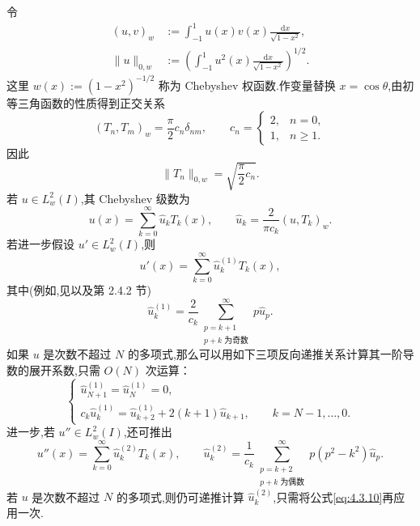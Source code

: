 令
\begin{equation}\label{eq:4.3.5}
  \begin{aligned}
    (u,v)_w&:=\int_{-1}^1u(x)v(x)\frac{\mathrm dx}{\sqrt{1-x^2}},\\
    \|u\|_{0,w}&:=\left(\int_{-1}^1u^2(x)\frac{\mathrm dx}{\sqrt{1-x^2}}\right)^{1/2}.
  \end{aligned}
\end{equation}
这里 \(w(x):=(1-x^2)^{-1/2}\) 称为 Chebyshev 权函数.作变量替换 \(x=\cos\theta\),由初等三角函数的性质得到正交关系
\begin{equation}\label{eq:4.3.6}
  (T_n,T_m)_w=\frac\pi2c_n\delta_{nm},\qquad
  c_n=\begin{cases}2,&n=0,\\1,&n\ge1.\end{cases}
\end{equation}
因此
\[
  \|T_n\|_{0,w}=\sqrt{\frac\pi2c_n}.
\]
若 \(u\in L_w^2(I)\),其 Chebyshev 级数为
\begin{equation}\label{eq:4.3.7}
  u(x)=\sum_{k=0}^\infty\widehat u_k T_k(x),\qquad
  \widehat u_k=\frac{2}{\pi c_k}(u,T_k)_w.
\end{equation}
若进一步假设 \(u'\in L_w^2(I)\),则
\begin{equation}\label{eq:4.3.8}
  u'(x)=\sum_{k=0}^\infty\widehat u_k^{(1)} T_k(x),
\end{equation}
其中(例如,见以及第 2.4.2 节)
\begin{equation}\label{eq:4.3.9}
  \widehat u_k^{(1)}=\frac2{c_k}
    \sum_{\substack{p=k+1\\p+k\text{ 为奇数}}}^{\infty}p\widehat u_p.
\end{equation}
如果 \(u\) 是次数不超过 \(N\) 的多项式,那么可以用如下三项反向递推关系计算其一阶导数的展开系数,只需 \(O(N)\) 次运算：
\begin{equation}\label{eq:4.3.10}
  \begin{cases}
    \widehat u_{N+1}^{(1)}=\widehat u_N^{(1)}=0,\\
    c_k\widehat u_k^{(1)}=\widehat u_{k+2}^{(1)}+2(k+1)\widehat u_{k+1},
    \qquad k=N-1,\ldots,0.
  \end{cases}
\end{equation}
进一步,若 \(u''\in L_w^2(I)\),还可推出
\begin{equation}\label{eq:4.3.11}
  u''(x)=\sum_{k=0}^\infty\widehat u_k^{(2)}T_k(x),\qquad
  \widehat u_k^{(2)}=\frac1{c_k}
  \sum_{\substack{p=k+2\\p+k\text{ 为偶数}}}^\infty p(p^2-k^2)\widehat u_p.
\end{equation}
若 \(u\) 是次数不超过 \(N\) 的多项式,则仍可递推计算 \(\widehat u_k^{(2)}\),只需将公式\eqref{eq:4.3.10}再应用一次.


